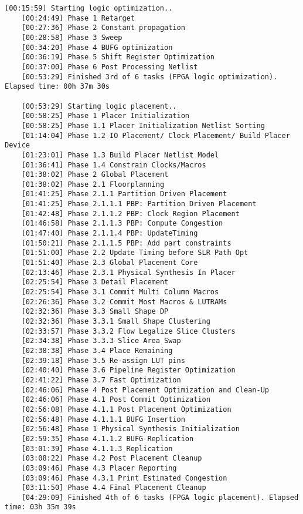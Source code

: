 \begin{lstlisting}[caption=Содержимое файла v++\_vinc.log для измененного проекта, label={log2}]
	[00:15:59] Starting logic optimization..
	[00:24:49] Phase 1 Retarget
	[00:27:36] Phase 2 Constant propagation
	[00:28:58] Phase 3 Sweep
	[00:34:20] Phase 4 BUFG optimization
	[00:36:19] Phase 5 Shift Register Optimization
	[00:37:00] Phase 6 Post Processing Netlist
	[00:53:29] Finished 3rd of 6 tasks (FPGA logic optimization). Elapsed time: 00h 37m 30s 
	
	[00:53:29] Starting logic placement..
	[00:58:25] Phase 1 Placer Initialization
	[00:58:25] Phase 1.1 Placer Initialization Netlist Sorting
	[01:14:04] Phase 1.2 IO Placement/ Clock Placement/ Build Placer Device
	[01:23:01] Phase 1.3 Build Placer Netlist Model
	[01:36:41] Phase 1.4 Constrain Clocks/Macros
	[01:38:02] Phase 2 Global Placement
	[01:38:02] Phase 2.1 Floorplanning
	[01:41:25] Phase 2.1.1 Partition Driven Placement
	[01:41:25] Phase 2.1.1.1 PBP: Partition Driven Placement
	[01:42:48] Phase 2.1.1.2 PBP: Clock Region Placement
	[01:46:58] Phase 2.1.1.3 PBP: Compute Congestion
	[01:47:40] Phase 2.1.1.4 PBP: UpdateTiming
	[01:50:21] Phase 2.1.1.5 PBP: Add part constraints
	[01:51:00] Phase 2.2 Update Timing before SLR Path Opt
	[01:51:40] Phase 2.3 Global Placement Core
	[02:13:46] Phase 2.3.1 Physical Synthesis In Placer
	[02:25:54] Phase 3 Detail Placement
	[02:25:54] Phase 3.1 Commit Multi Column Macros
	[02:26:36] Phase 3.2 Commit Most Macros & LUTRAMs
	[02:32:36] Phase 3.3 Small Shape DP
	[02:32:36] Phase 3.3.1 Small Shape Clustering
	[02:33:57] Phase 3.3.2 Flow Legalize Slice Clusters
	[02:34:38] Phase 3.3.3 Slice Area Swap
	[02:38:38] Phase 3.4 Place Remaining
	[02:39:18] Phase 3.5 Re-assign LUT pins
	[02:40:40] Phase 3.6 Pipeline Register Optimization
	[02:41:22] Phase 3.7 Fast Optimization
	[02:46:06] Phase 4 Post Placement Optimization and Clean-Up
	[02:46:06] Phase 4.1 Post Commit Optimization
	[02:56:08] Phase 4.1.1 Post Placement Optimization
	[02:56:48] Phase 4.1.1.1 BUFG Insertion
	[02:56:48] Phase 1 Physical Synthesis Initialization
	[02:59:35] Phase 4.1.1.2 BUFG Replication
	[03:01:39] Phase 4.1.1.3 Replication
	[03:08:22] Phase 4.2 Post Placement Cleanup
	[03:09:46] Phase 4.3 Placer Reporting
	[03:09:46] Phase 4.3.1 Print Estimated Congestion
	[03:11:50] Phase 4.4 Final Placement Cleanup
	[04:29:09] Finished 4th of 6 tasks (FPGA logic placement). Elapsed time: 03h 35m 39s 
	

\end{lstlisting}
